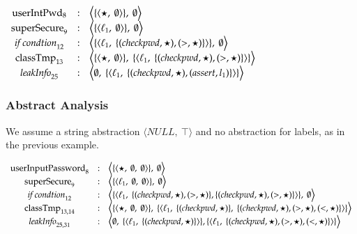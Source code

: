 \documentclass{llncs}
\newcommand{\blangle}{\big\langle}
\newcommand{\brangle}{\big\rangle}
\begin{document}
\begin{center}
\hskip-0.5cm
{\footnotesize$
\begin{array}{ccl}
\mbox{userIntPwd}_{8} &:& \blangle\{\langle \star,\ \emptyset\rangle\},\ \emptyset\brangle\\
\mbox{superSecure}_{9} &:& \blangle\{\langle \ell_1,\ \emptyset\rangle\},\ \emptyset\brangle\\
\mbox{\textit{if condtion}}_{12} &:& \blangle\{\langle \ell_1,\ \{(checkpwd, \star), (>, \star)\}\rangle\},\ \emptyset\brangle\\
\mbox{classTmp}_{13} &:& \blangle\{\langle \star,\ \emptyset\rangle\},\ \{\langle \ell_1,\ \{(checkpwd, \star), (>, \star)\}\rangle\}\brangle\\
\mbox{\textit{leakInfo}}_{25} &:& \blangle\emptyset,\ \{\langle \ell_1,\ \{(checkpwd, \star), (assert, l_1)\}\rangle\}\brangle\\
\end{array}
$}
\end{center}

\subsubsection{Abstract Analysis}
We assume a string abstraction $\langle NULL,\ \top \rangle$ and no abstraction for labels, as in the previous example.

\begin{center}
{\footnotesize$
\begin{array}{ccl}
\mbox{userInputPassword}_{8} &:& \blangle\{\langle \star,\ \emptyset,\ \emptyset\rangle\},\ \emptyset\brangle\\
\mbox{superSecure}_{9} &:& \blangle\{\langle \ell_1,\ \emptyset,\ \emptyset\rangle\},\ \emptyset\brangle\\
\mbox{\textit{if condtion}}_{12} &:& \blangle\{\langle \ell_1,\ \{(checkpwd, \star), (>, \star)\}, \{(checkpwd, \star), (>, \star)\}\rangle\},\ \emptyset\brangle\\
\mbox{classTmp}_{13,14} &:& \blangle\{\langle \star,\ \emptyset,\ \emptyset\rangle\},\ \{\langle \ell_1,\ \{(checkpwd, \star)\},\ \{(checkpwd, \star), (>, \star), (<, \star)\}\rangle\}\brangle\\
\mbox{\textit{leakInfo}}_{25,31} &:& \blangle\emptyset,\ \{\langle \ell_1,\ \{(checkpwd, \star)\}\rangle\},\{\langle \ell_1,\ \{(checkpwd, \star), (>, \star), (<, \star)\}\rangle\}\brangle\\
\end{array}
$}
\end{center}
\end{document}
